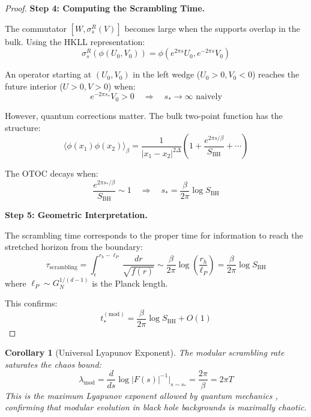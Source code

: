 \documentclass[12pt,a4paper]{article}
\newtheorem{corollary}[theorem]{Corollary}
\begin{document}
\begin{proof}
\textbf{Step 4: Computing the Scrambling Time.}

The commutator $[W, \sigma_s^R(V)]$ becomes large when the supports overlap in the bulk. Using the HKLL representation:
\begin{equation}
\sigma_s^R(\phi(U_0, V_0)) = \phi(e^{2\pi s} U_0, e^{-2\pi s} V_0)
\end{equation}

An operator starting at $(U_0, V_0)$ in the left wedge ($U_0 > 0, V_0 < 0$) reaches the future interior ($U > 0, V > 0$) when:
\begin{equation}
e^{-2\pi s_*} V_0 > 0 \quad \Rightarrow \quad s_* \to \infty \text{ naively}
\end{equation}

However, quantum corrections matter. The bulk two-point function has the structure:
\begin{equation}
\langle \phi(x_1) \phi(x_2) \rangle_\beta = \frac{1}{|x_1 - x_2|^{2\Delta}} \left(1 + \frac{e^{2\pi s/\beta}}{S_{\text{BH}}} + \cdots \right)
\end{equation}

The OTOC decays when:
\begin{equation}
\frac{e^{2\pi s_*/\beta}}{S_{\text{BH}}} \sim 1 \quad \Rightarrow \quad s_* = \frac{\beta}{2\pi} \log S_{\text{BH}}
\end{equation}

\textbf{Step 5: Geometric Interpretation.}

The scrambling time corresponds to the proper time for information to reach the stretched horizon from the boundary:
\begin{equation}
\tau_{\text{scrambling}} = \int_{\epsilon}^{r_h - \ell_P} \frac{dr}{\sqrt{f(r)}} \sim \frac{\beta}{2\pi} \log\left(\frac{r_h}{\ell_P}\right) = \frac{\beta}{2\pi} \log S_{\text{BH}}
\end{equation}
where $\ell_P \sim G_N^{1/(d-1)}$ is the Planck length.

This confirms:
\begin{equation}
\boxed{t_*^{(\text{mod})} = \frac{\beta}{2\pi} \log S_{\text{BH}} + O(1)}
\end{equation}
\end{proof}

\begin{corollary}[Universal Lyapunov Exponent]
The modular scrambling rate saturates the chaos bound:
\begin{equation}
\lambda_{\text{mod}} = \frac{d}{ds} \log |F(s)|^{-1}\Big|_{s \sim s_*} = \frac{2\pi}{\beta} = 2\pi T
\end{equation}
This is the maximum Lyapunov exponent allowed by quantum mechanics \cite{maldacena2016bound}, confirming that modular evolution in black hole backgrounds is maximally chaotic.
\end{corollary}
\end{document}
